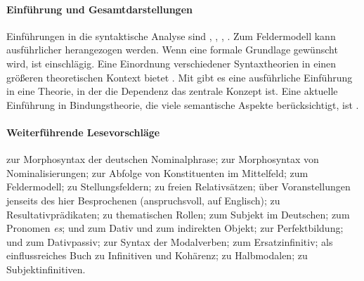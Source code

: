 \WeitereLiteratur

\begin{sloppypar}

\paragraph*{Einführung und Gesamtdarstellungen}

Einführungen in die syntaktische Analyse sind \zB \citet{Duerscheid2012}, \citet{WoellsteinEa1997}, \citet{Eroms2000}, \citet{Musan2009}.
Zum Feldermodell kann ausführlicher \citet{Woellstein2010} herangezogen werden.
Wenn eine formale Grundlage gewünscht wird, ist \citet{Mueller08} einschlägig.
Eine Einordnung verschiedener Syntaxtheorien in einen größeren theoretischen Kontext bietet \citet{Mueller10}.
Mit \citet{Engel09} gibt es eine ausführliche Einführung in eine Theorie, in der die Dependenz das zentrale Konzept ist.
Eine aktuelle Einführung in Bindungstheorie, die viele semantische Aspekte berücksichtigt, ist \citet{Buering2005}.

\paragraph*{Weiterführende Lesevorschläge}
\citet{Gallmann1996} zur Morphosyntax der deutschen Nominalphrase;
\citet{Fabricius1993} zur Morphosyntax von Nominalisierungen;
\citet{Loetscher1981} zur Abfolge von Konstituenten im Mittelfeld;
\citet{Hoehle1986} zum Feldermodell;
\citet{Askedal1986} zu Stellungsfeldern;
\citet{Pittner2003} zu freien Relativsätzen;
\citet{DekuthyMeurers2001} über Voranstellungen jenseits des hier Besprochenen (anspruchsvoll, auf Englisch);
\citet{Richter2002} zu Resultativprädikaten;
\citet{Dowty91} zu thematischen Rollen;
\citet{Reis1982} zum Subjekt im Deutschen;
\citet{Askedal1990} zum Pronomen \textit{es};
\citet{Wegener1986} und \citet{Wegener1991} zum Dativ und zum indirekten Objekt;
\citet{Musan1999} zur Perfektbildung;
\citet{HentschelWeydt1995} und \citet{Leirbukt2013} zum Dativpassiv;
\citet{Reis2001} zur Syntax der Modalverben;
\citet{Askedal1991} zum Ersatzinfinitiv;
\citet{Bech1983} als einflussreiches Buch zu Infinitiven und Kohärenz;
\citet{Reis2005} zu Halbmodalen;
\citet{Askedal1988} zu Subjektinfinitiven.

\end{sloppypar}
